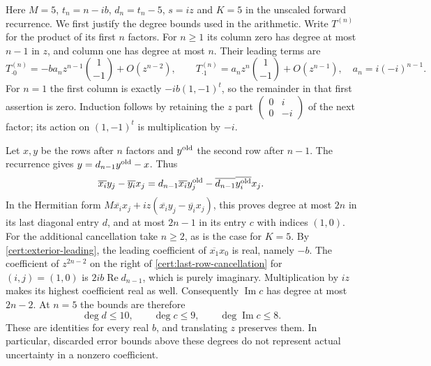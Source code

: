 Here $M=5$, $t_n=n-ib$, $d_n=t_n-5$, $s=iz$ and $K=5$ in
the unscaled forward recurrence.  We first justify the degree bounds
used in the arithmetic.  Write $T^{(n)}$ for the product of its first
$n$ factors.  For $n\ge1$ its column zero has degree at most $n-1$
in $z$, and column one has degree at most $n$.  Their leading terms are
\begin{equation}\label{cert:exterior-leading}
 T^{(n)}_{\cdot0}=-b a_nz^{n-1}\binom{1}{-1}
     +O(z^{n-2}),\qquad
 T^{(n)}_{\cdot1}=a_nz^n\binom{1}{-1}+O(z^{n-1}),
 \quad a_n=i(-i)^{n-1}.
\end{equation}
For $n=1$ the first column is exactly $-ib(1,-1)^t$, so the
remainder in that first assertion is zero.  Induction follows by
retaining the $z$ part
$\left(\begin{smallmatrix}0&i\\0&-i\end{smallmatrix}\right)$
of the next factor; its action on $(1,-1)^t$ is multiplication by
$-i$.

Let $x,y$ be the rows after $n$ factors and $y^{\rm old}$ the second
row after $n-1$.  The recurrence gives
$y=d_{n-1}y^{\rm old}-x$.  Thus
\begin{equation}\label{cert:last-row-cancellation}
 \overline{x_i}y_j-\overline{y_i}x_j
 =d_{n-1}\overline{x_i}y_j^{\rm old}
  -\overline{d_{n-1}}\overline{y_i^{\rm old}}x_j.
\end{equation}
In the Hermitian form
$M\overline{x_i}x_j+iz(\overline{x_i}y_j-\overline{y_i}x_j)$,
this proves degree at most $2n$ in its last diagonal entry $d$,
and at most $2n-1$ in its entry $c$ with indices $(1,0)$.
For the additional cancellation take $n\ge2$, as is the case for
$K=5$.  By
\eqref{cert:exterior-leading}, the leading coefficient of
$\overline{x_1}x_0$ is real, namely $-b$.  The coefficient of
$z^{2n-2}$ on the right of
\eqref{cert:last-row-cancellation} for $(i,j)=(1,0)$ is
$2ib\operatorname{Re}d_{n-1}$, which is purely imaginary.
Multiplication by $iz$ makes its highest coefficient real as well.
Consequently $\operatorname{Im}c$ has degree at most $2n-2$.
At $n=5$ the bounds are therefore
\begin{equation}\label{cert:exterior-degrees}
 \deg d\le10,\qquad \deg c\le9,\qquad
 \deg\operatorname{Im}c\le8.
\end{equation}
These are identities for every real $b$, and translating $z$ preserves
them.  In particular, discarded error bounds above these degrees do
not represent actual uncertainty in a nonzero coefficient.

